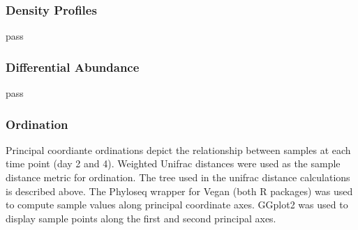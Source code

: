\subsubsection{Density Profiles}
pass

\subsubsection{Differential Abundance}
pass

\subsubsection{Ordination}
Principal coordiante ordinations depict the relationship between samples at each time point (day 2 and 4). Weighted Unifrac distances \cite{16332807} were used as the sample distance metric for ordination. The tree used in the unifrac distance calculations is described above. The Phyloseq \cite{24699258} wrapper for Vegan \cite{vegan} (both R packages) was used to compute sample values along principal coordinate axes. GGplot2 \cite{ggplot2} was used to display sample points along the first and second principal axes.    